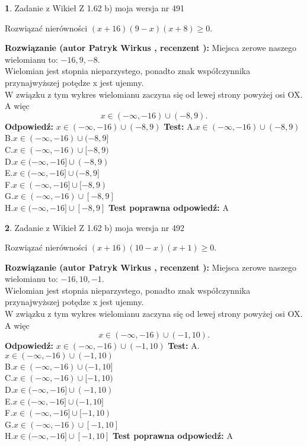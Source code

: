 \documentclass[12pt, a4paper]{article}
\theoremstyle{definition} %
\newtheorem{zad}{}
\newcommand{\zadStart}[1]{\begin{zad}#1\newline}
\newcommand{\zadStop}{\end{zad}}
\newcommand{\rozwStart}[2]{\noindent \textbf{Rozwiązanie (autor #1 , recenzent #2): }\newline}
\newcommand{\rozwStop}{\newline}
\newcommand{\odpStart}{\noindent \textbf{Odpowiedź:}\newline}
\newcommand{\odpStop}{\newline}
\newcommand{\testStart}{\noindent \textbf{Test:}\newline}
\newcommand{\testStop}{\newline}
\newcommand{\kluczStart}{\noindent \textbf{Test poprawna odpowiedź:}\newline}
\newcommand{\kluczStop}{\newline}
\begin{document}
\zadStart{Zadanie z Wikieł Z 1.62 b) moja wersja nr 491}

Rozwiązać nierówności $(x+16)(9-x)(x+8)\ge0$.
\zadStop
\rozwStart{Patryk Wirkus}{}
Miejsca zerowe naszego wielomianu to: $-16, 9, -8$.\\
Wielomian jest stopnia nieparzystego, ponadto znak współczynnika przy\linebreak najwyższej potędze x jest ujemny.\\ W związku z tym wykres wielomianu zaczyna się od lewej strony powyżej osi OX. A więc $$x \in (-\infty,-16) \cup (-8,9).$$
\rozwStop
\odpStart
$x \in (-\infty,-16) \cup (-8,9)$
\odpStop
\testStart
A.$x \in (-\infty,-16) \cup (-8,9)$\\
B.$x \in (-\infty,-16) \cup (-8,9]$\\
C.$x \in (-\infty,-16) \cup [-8,9)$\\
D.$x \in (-\infty,-16] \cup (-8,9)$\\
E.$x \in (-\infty,-16] \cup (-8,9]$\\
F.$x \in (-\infty,-16] \cup [-8,9)$\\
G.$x \in (-\infty,-16) \cup [-8,9]$\\
H.$x \in (-\infty,-16] \cup [-8,9]$
\testStop
\kluczStart
A
\kluczStop



\zadStart{Zadanie z Wikieł Z 1.62 b) moja wersja nr 492}

Rozwiązać nierówności $(x+16)(10-x)(x+1)\ge0$.
\zadStop
\rozwStart{Patryk Wirkus}{}
Miejsca zerowe naszego wielomianu to: $-16, 10, -1$.\\
Wielomian jest stopnia nieparzystego, ponadto znak współczynnika przy\linebreak najwyższej potędze x jest ujemny.\\ W związku z tym wykres wielomianu zaczyna się od lewej strony powyżej osi OX. A więc $$x \in (-\infty,-16) \cup (-1,10).$$
\rozwStop
\odpStart
$x \in (-\infty,-16) \cup (-1,10)$
\odpStop
\testStart
A.$x \in (-\infty,-16) \cup (-1,10)$\\
B.$x \in (-\infty,-16) \cup (-1,10]$\\
C.$x \in (-\infty,-16) \cup [-1,10)$\\
D.$x \in (-\infty,-16] \cup (-1,10)$\\
E.$x \in (-\infty,-16] \cup (-1,10]$\\
F.$x \in (-\infty,-16] \cup [-1,10)$\\
G.$x \in (-\infty,-16) \cup [-1,10]$\\
H.$x \in (-\infty,-16] \cup [-1,10]$
\testStop
\kluczStart
A
\kluczStop
\end{document}
